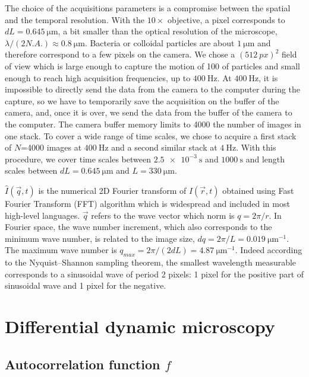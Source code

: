 \documentclass[prb,twocolumn,amsmath,amssymb]{revtex4-1}
\newcommand{\tgn}[1]{{\color{blue}#1}} %
\begin{document}
The choice of the acquisitions parameters is a compromise between the spatial and the temporal resolution. With the $10\times$ objective, a pixel corresponds to $dL=\SI{0.645}{\micro\meter}$, a bit smaller than the optical resolution of the microscope, $\lambda/(2N.A.)\approx\SI{0.8}{\micro\meter} $. Bacteria or colloidal particles are about $\SI{1}{\micro\meter}$ and therefore correspond to a few pixels on the camera. We chose a $(\SI{512}{px})^2$ field of view which is large enough to capture the motion of 100 of particles and small enough to reach high acquisition frequencies, up to $\SI{400}{\hertz}$. At $\SI{400}{\hertz}$, it is impossible to directly send the data from the camera to the computer during the capture, so we have to temporarily save the acquisition on the buffer of the camera, and, once it is over, we send the data from the buffer of the camera to the computer. The camera buffer memory limits  to 4000 the number of images in one stack. To cover a wide range of time scales, we chose to acquire a first stack of $N$=4000 images at $\SI{400}{\hertz}$ and a second similar stack at $\SI{4}{\hertz}$. With this procedure, we cover time scales between $\SI{2.5e-3}{\second}$ and $\SI{1000}{\second}$ and length scales between $dL=\SI{0.645}{\micro\meter}$ and $L=\SI{330}{\micro\meter}$. 

\tgn{$\hat{I}(\vec{q}, t)$ is the numerical 2D Fourier transform of $I(\vec{r}, t)$ obtained using Fast Fourier Transform (FFT) algorithm which is widespread and included in most high-level languages. $\vec{q}$ refers to the wave vector which norm is $q=2\pi/r$.} In Fourier space, the wave number increment, which also corresponds to the minimum wave number, is related to the image size, $dq=2\pi/L=\SI{0.019}{\micro\meter^{-1}}$. The maximum wave number is $q_{max}=2\pi/(2dL)=\SI{4.87}{\micro\meter^{-1}}$. Indeed according to the Nyquist–Shannon sampling theorem, the smallest wavelength measurable corresponds to a sinusoidal wave of period 2 pixels: 1 pixel for the positive part of sinusoidal wave and 1 pixel for the negative.

\section{Differential dynamic microscopy}
\label{sec:ddm}

\subsection{Autocorrelation function $f$}
\label{sec:ddm1}
\end{document}
